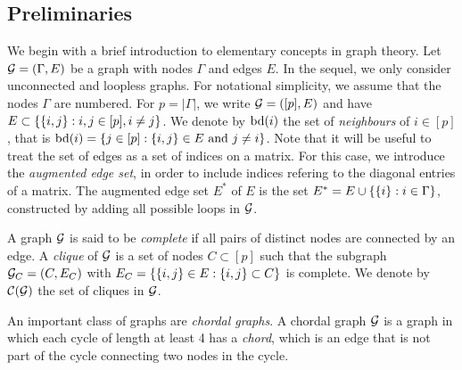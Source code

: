 \subsection{Preliminaries} \label{sec-prelim}

We begin with a brief introduction to elementary concepts in graph theory. Let ${\mathcal{G}} = (\Gamma, E)$ be a graph with nodes $\Gamma$ and edges $E$. In the sequel, we only consider unconnected and loopless graphs. For notational simplicity, we assume that the nodes $\Gamma$ are numbered. For $p = |\Gamma|$, we write ${\mathcal{G}} = ([p], E)$ and have $E \subset {\left\{ {\left\{i, j\right\}} : i, j \in [p], i \neq j \right\}}$.  We denote by ${\textrm{bd}}(i)$ the set of \textit{neighbours} of $i \in [p]$, that is ${\textrm{bd}}(i) = {\left\{ j \in [p] : {\left\{i, j\right\}} \in E {\textrm{ and }} j \neq i\right\}}$.  Note that it will be useful to treat the set of edges as a set of indices on a matrix. For this case, we introduce the \textit{augmented edge set}, in order to include indices refering to the diagonal entries of a matrix. The augmented edge set $E^*$ of $E$ is the set $E^* = E \cup {\left\{ {\left\{i\right\}} : i \in \Gamma \right\}}$, constructed by adding all possible loops in ${\mathcal{G}}$.

A graph ${\mathcal{G}}$ is said to be \textit{complete} if all pairs of distinct nodes are connected by an edge. A \textit{clique} of ${\mathcal{G}}$ is a set of nodes $C \subset [p]$ such that the subgraph ${\mathcal{G}}_C = (C, E_C)$ with $E_C = {\left\{ {\left\{i, j\right\}} \in E : {\left\{i, j\right\}} \subset C \right\}}$ is complete. We denote by ${\mathcal{C}}({\mathcal{G}})$ the set of cliques in ${\mathcal{G}}$.

An important class of graphs are \textit{chordal graphs}. A chordal graph ${\mathcal{G}}$ is a graph in which each cycle of length at least 4 has a \textit{chord}, which is an edge that is not part of the cycle connecting two nodes in the cycle.

